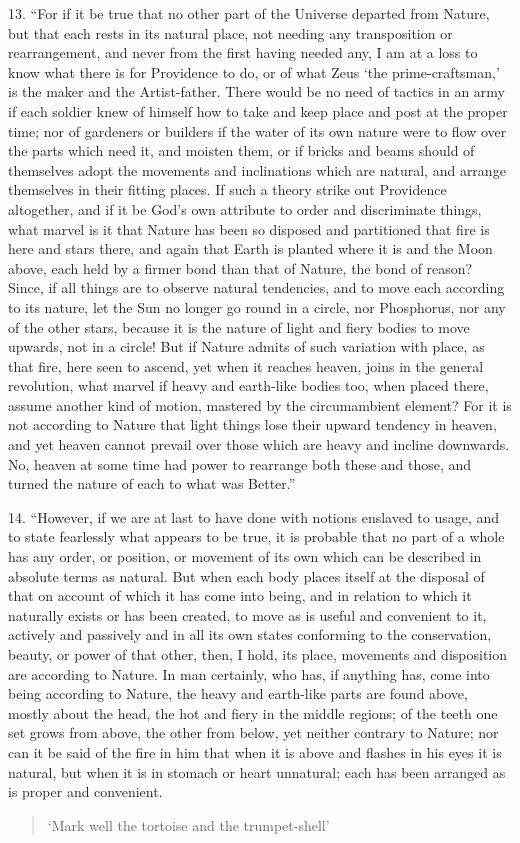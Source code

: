 \documentclass[a4paper, 11pt, oneside, polutonikogreek, english]{article}
\begin{document}
13. ``For if it be true that no other part of the Universe departed from Nature, but that each rests in its natural place, not needing any transposition or rearrangement, and never from the first having needed any, I am at a loss to know what there is for Providence to do, or of what Zeus `the prime-craftsman,' is the maker and the Artist-father. There would be no need of tactics in an army if each soldier knew of himself how to take and keep place and post at the proper time; nor of gardeners or builders if the water of its own nature were to flow over the parts which need it, and moisten them, or if bricks and beams should of themselves adopt the movements and inclinations which are natural, and arrange themselves in their fitting places. If such a theory strike out Providence altogether, and if it be God's own attribute to order and discriminate things, what marvel is it that Nature has been so disposed and partitioned that fire is here and stars there, and again that Earth is planted where it is and the Moon above, each held by a firmer bond than that of Nature, the bond of reason? Since, if all things are to observe natural tendencies, and to move each according to its nature, let the Sun no longer go round in a circle, nor Phosphorus, nor any of the other stars, because it is the nature of light and fiery bodies to move upwards, not in a circle! But if Nature admits of such variation with place, as that fire, here seen to ascend, yet when it reaches heaven, joins in the general revolution, what marvel if heavy and earth-like bodies too, when placed there, assume another kind of motion, mastered by the circumambient element? For it is not according to Nature that light things lose their upward tendency in heaven, and yet heaven cannot prevail over those which are heavy and incline downwards. No, heaven at some time had power to rearrange both these and those, and turned the nature of each to what was Better.''

14. ``However, if we are at last to have done with notions enslaved to usage, and to state fearlessly what appears to be true, it is probable that no part of a whole has any order, or position, or movement of its own which can be described in absolute terms as natural. But when each body places itself at the disposal of that on account of which it has come into being, and in relation to which it naturally exists or has been created, to move as is useful and convenient to it, actively and passively and in all its own states conforming to the conservation, beauty, or power of that other, then, I hold, its place, movements and disposition are according to Nature. In man certainly, who has, if anything has, come into being according to Nature, the heavy and earth-like parts are found above, mostly about the head, the hot and fiery in the middle regions; of the teeth one set grows from above, the other from below, yet neither contrary to Nature; nor can it be said of the fire in him that when it is above and flashes in his eyes it is natural, but when it is in stomach or heart unnatural; each has been arranged as is proper and convenient.
\begin{quotation}
`Mark well the tortoise and the trumpet-shell'
 \end{quotation}
\end{document}
